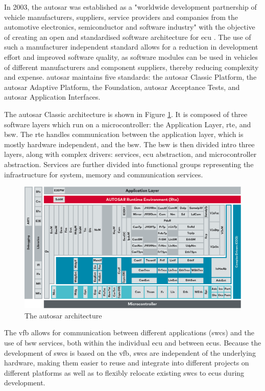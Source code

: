 In 2003, the \gls{autosar} was established as a "worldwide development partnership of vehicle manufacturers, suppliers, service providers and companies from the automotive electronics, semiconductor and software industry" with the objective of creating an open and standardised software architecture for \gls{ecu} \citep{autosar}. The use of such a manufacturer independent standard allows for a reduction in development effort and improved software quality, as software modules can be used in vehicles of different manufacturers and component suppliers, thereby reducing complexity and expense. \gls{autosar} maintains five standards: the \gls{autosar} Classic Platform, the \gls{autosar} Adaptive Platform, the Foundation, \gls{autosar} Acceptance Tests, and \gls{autosar} Application Interfaces.\par

The \gls{autosar} Classic architecture is shown in Figure \ref{fig:autosar_arch}. It is composed of three software layers which run on a microcontroller: the Application Layer, \gls{rte}, and \gls{bsw}. The \gls{rte} handles communication between the application layer, which is mostly hardware independent, and the \gls{bsw}. The \gls{bsw} is then divided intro three layers, along with complex drivers: services, \gls{ecu} abstraction, and microcontroller abstraction. Services are further divided into functional groups representing the infrastructure for system, memory and communication services.

\begin{figure}
    \centering
    \includegraphics[width = \linewidth]{img/parts/introduction/AUTOSAR.png}
    \caption{The \gls{autosar} architecture \citep{autosar_arch}}
    \label{fig:autosar_arch}
\end{figure}

The \gls{vfb} allows for communication between different applications (\glspl{swc}) and the use of \gls{bsw} services, both within the individual \gls{ecu} and between \glspl{ecu}. Because the development of \glspl{swc} is based on the \gls{vfb}, \glspl{swc} are independent of the underlying hardware, making them easier to reuse and integrate into different projects on different platforms as well as to flexibly relocate existing \glspl{swc} to \glspl{ecu} during development.\par

